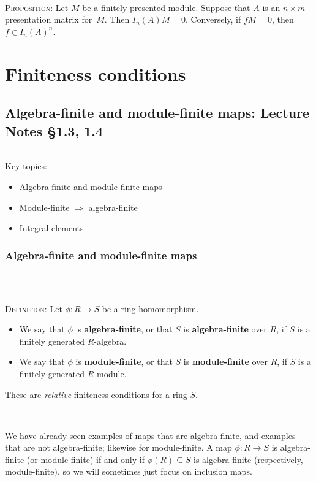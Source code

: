 \documentclass[12pt]{amsart}
\newcommand{\0}{$\phantom{.}$}
\newcommand{\1}{\mathbbm{1}}
\newcommand{\sssec}[1]{\subsubsection*{#1}}
\begin{document}
\



\noindent \textsc{Proposition:} Let $M$ be a finitely presented module. Suppose that $A$ is an $n\times m$ presentation matrix for~$M$. Then $I_n(A) M = 0$. Conversely, if $f M=0$, then $f\in I_n(A)^n$.


\newpage

\section{Finiteness conditions} 
\setcounter{subsection}{5}

\subsection{Algebra-finite and module-finite maps:  Lecture Notes \S1.3, 1.4}\0

\begin{framed} Key topics:
\begin{itemize}
\item Algebra-finite and module-finite maps
\item Module-finite $\Longrightarrow$ algebra-finite
\item Integral elements
\end{itemize}
\end{framed}

\sssec{Algebra-finite and module-finite maps} \0

\

\noindent \textsc{Definition:} Let $\phi:R \to S$ be a ring homomorphism.
\begin{itemize}[leftmargin=*]

\item We say that $\phi$ is \textbf{algebra-finite}, or that $S$ is \textbf{algebra-finite} over $R$, if $S$ is a finitely generated $R$-algebra.
\item We say that $\phi$ is  \textbf{module-finite}, or that $S$ is \textbf{module-finite} over $R$, if $S$ is a finitely generated $R$-module.
\end{itemize}These are \emph{relative} finiteness conditions for a ring $S$.

\

\noindent We have already seen examples of maps that are algebra-finite, and examples that are not algebra-finite; likewise for module-finite. A map $\phi:R\to S$ is algebra-finite (or module-finite) if and only if $\phi(R) \subseteq S$ is algebra-finite (respectively, module-finite), so we will sometimes just focus on inclusion maps.
\end{document}
